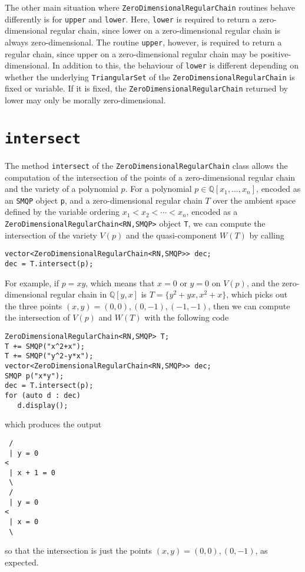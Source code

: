 The other main situation where  \texttt{ZeroDimensionalRegularChain} routines behave differently is for \texttt{upper} and \texttt{lower}. Here, \texttt{lower} is required to return a zero-dimensional regular chain, since lower on a zero-dimensional regular chain is always zero-dimensional. The routine \texttt{upper}, however, is required to return a regular chain, since upper on a zero-dimensional regular chain may be positive-dimensional. In addition to this, the behaviour of \texttt{lower} is different depending on whether the underlying \texttt{TriangularSet} of the  \texttt{Zero\-Dimensional\-Regular\-Chain} is fixed or variable. If it is fixed, the \texttt{Zero\-Dimensional\-Regular\-Chain} returned by lower may only be morally zero-dimensional.

\section{\texttt{intersect}}
The method \texttt{intersect} of the \texttt{ZeroDimensionalRegularChain} class allows the computation of the intersection of the points of a zero-dimensional regular chain and the variety of a polynomial $p$. For a polynomial $p\in\mathbb{Q}[x_1,\ldots,x_n]$, encoded as an \texttt{SMQP} object \texttt{p}, and a zero-dimensional regular chain $T$ over the ambient space defined by the variable ordering $x_1<x_2<\cdots<x_n$, encoded as a \texttt{ZeroDimensionalRegularChain<RN,SMQP>} object \texttt{T},  we can compute the intersection of the variety $V(p)$ and the quasi-component $W(T)$ by calling
\begin{verbatim}
vector<ZeroDimensionalRegularChain<RN,SMQP>> dec;
dec = T.intersect(p);
\end{verbatim}
For example, if $p=xy$, which means that $x=0$ or $y=0$ on $V(p)$, and the zero-dimensional regular chain in $\mathbb{Q}[y,x]$ is $T=\{y^2+yx,x^2+x\}$, which picks out the three points $(x,y)=(0,0),(0,-1),(-1,-1)$, then we can compute the intersection of $V(p)$ and $W(T)$ with the following code
\begin{verbatim}
ZeroDimensionalRegularChain<RN,SMQP> T;
T += SMQP("x^2+x");
T += SMQP("y^2-y*x");
vector<ZeroDimensionalRegularChain<RN,SMQP>> dec;
SMQP p("x*y");
dec = T.intersect(p);
for (auto d : dec)
   d.display();
\end{verbatim}
which produces the output
\begin{verbatim}
 /
 | y = 0
< 
 | x + 1 = 0
 \ 
 /
 | y = 0
< 
 | x = 0
 \ 
\end{verbatim}
so that the intersection is just the points $(x,y)=(0,0),(0,-1)$, as expected.

